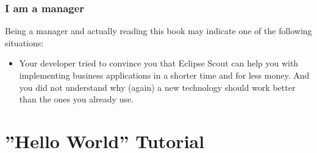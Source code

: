 \documentclass[a4paper,10pt,twoside]{book}
\begin{document}

\subsection{I am a manager}

Being a manager and actually reading this book may indicate one of the following situations:

\begin{itemize}
  \item Your developer tried to convince you that Eclipse Scout can help you with implementing business applications in a shorter time and for less money.
        And you did not understand why (again) a new technology should work better than the ones you already use. 
	
\end{itemize}

\chapter{''Hello World'' Tutorial}
\end{document}
